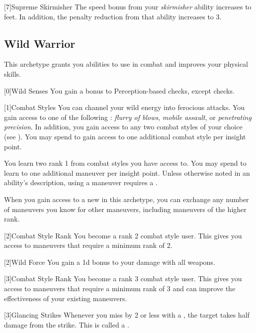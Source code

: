         [7]{Supreme Skirmisher} The speed bonus from your \textit{skirmisher} ability increases to  feet.
        In addition, the penalty reduction from that ability increases to 3.

    \newpage
    \subsection{Wild Warrior}
        This archetype grants you abilities to use in combat and improves your physical skills.

        [0]{Wild Senses} You gain a  bonus to Perception-based checks, except  checks.

        {
            [1]{Combat Styles}
            You can channel your wild energy into ferocious attacks.
            You gain access to one of the following : \textit{flurry of blows}, \textit{mobile assault}, or \textit{penetrating precision}.
            In addition, you gain access to any two combat styles of your choice (see ).
            You may spend  to gain access to one additional combat style per insight point.

            You learn two rank 1  from combat styles you have access to.
            You may spend  to learn to one additional maneuver per insight point.
            Unless otherwise noted in an ability's description, using a maneuver requires a .

            When you gain access to a new  in this archetype,
                you can exchange any number of maneuvers you know for other maneuvers,
                including maneuvers of the higher rank.
        }

        {
            [2]{Combat Style Rank} You become a rank 2 combat style user.
            This gives you access to maneuvers that require a minimum rank of 2.

            [2]{Wild Force} You gain a \plus1d bonus to your damage with all weapons.
        }

        {
            [3]{Combat Style Rank} You become a rank 3 combat style user.
            This gives you access to maneuvers that require a minimum rank of 3 and can improve the effectiveness of your existing maneuvers.

            [3]{Glancing Strikes} Whenever you miss by 2 or less with a , the target takes half damage from the strike.
            This is called a .
        }

